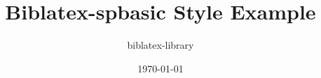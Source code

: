 \documentclass[12pt, a4paper]{article}
\title{Biblatex-spbasic Style Example}
\author{biblatex-library}
\date{\today}
\begin{document}
\nocite{*}
\printbibliography
\end{document}
